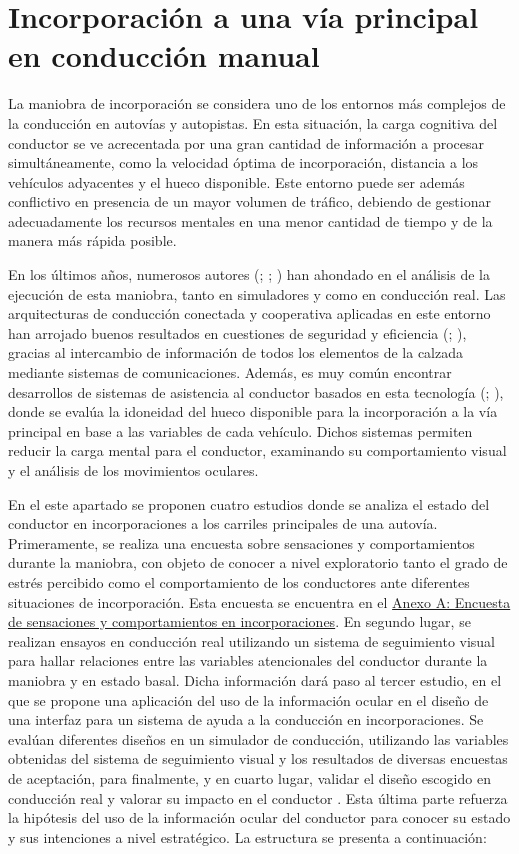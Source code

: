 \section{Incorporación a una vía principal en conducción manual}\label{31}

La maniobra de incorporación se considera uno de los entornos más complejos de la conducción en autovías y autopistas. En esta situación, la carga cognitiva del conductor se ve acrecentada por una gran cantidad de información a procesar simultáneamente, como la velocidad óptima de incorporación, distancia a los vehículos adyacentes y el hueco disponible. Este entorno puede ser además conflictivo en presencia de un mayor volumen de tráfico, debiendo de gestionar adecuadamente los recursos mentales en una menor cantidad de tiempo y de la manera más rápida posible.

En los últimos años, numerosos autores (\cite{duan}; \cite{xu}; \cite{awan}) han ahondado en el análisis de la ejecución de esta maniobra, tanto en simuladores y como en conducción real. Las arquitecturas de conducción conectada y cooperativa aplicadas en este entorno han arrojado buenos resultados en cuestiones de seguridad y eficiencia (\cite{weaver21}; \cite{liao}), gracias al intercambio de información de todos los elementos de la calzada mediante sistemas de comunicaciones. Además, es muy común encontrar desarrollos de sistemas de asistencia al conductor basados en esta tecnología (\cite{cheng16}; \cite{ahmed18}), donde se evalúa la idoneidad del hueco disponible para la incorporación a la vía principal en base a las variables de cada vehículo. Dichos sistemas permiten reducir la carga mental para el conductor, examinando su comportamiento visual y el análisis de los movimientos oculares.

En el este apartado se proponen cuatro estudios donde se analiza el estado del conductor en incorporaciones a los carriles principales de una autovía. Primeramente, se realiza una encuesta sobre sensaciones y comportamientos durante la maniobra, con objeto de conocer a nivel exploratorio tanto el grado de estrés percibido como el comportamiento de los conductores ante diferentes situaciones de incorporación. Esta encuesta se encuentra en el \hyperref[AA]{Anexo A: Encuesta de sensaciones y comportamientos en incorporaciones}. En segundo lugar, se realizan ensayos en conducción real utilizando un sistema de seguimiento visual para hallar relaciones entre las variables atencionales del conductor durante la maniobra y en estado basal. Dicha información dará paso al tercer estudio, en el que se propone una aplicación del uso de la información ocular en el diseño de una interfaz para un sistema de ayuda a la conducción en incorporaciones. Se evalúan diferentes diseños en un simulador de conducción, utilizando las variables obtenidas del sistema de seguimiento visual y los resultados de diversas encuestas de aceptación, para finalmente, y en cuarto lugar, validar el diseño escogido en conducción real y valorar su impacto en el conductor . Esta última parte refuerza la hipótesis del uso de la información ocular del conductor para conocer su estado y sus intenciones a nivel estratégico. La estructura se presenta a continuación:

